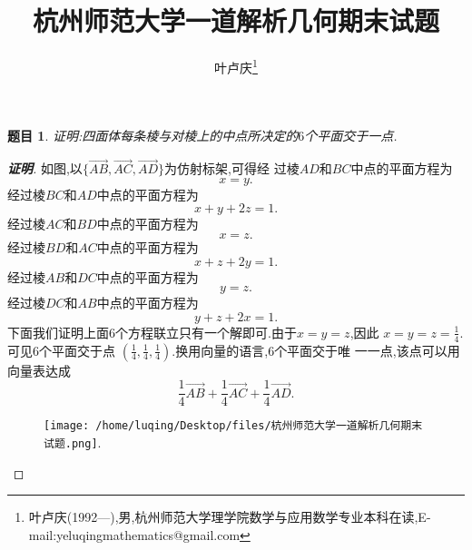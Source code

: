 \documentclass[a4paper]{article}
\newtheorem*{exe}{题目}
\newenvironment{exercise}
{\bigskip\begin{mdframed}\begin{exe}}
    {\end{exe}\end{mdframed}\bigskip}
\newcommand{\ov}{\overrightarrow}
\begin{document}
\title{\huge{\bf{杭州师范大学一道解析几何期末试题}}} \author{\small{叶卢庆\footnote{叶卢庆(1992---),男,杭州师范大学理学院数学与应用数学专业本科在读,E-mail:yeluqingmathematics@gmail.com}}}
\maketitle
\begin{exercise}
  证明:四面体每条棱与对棱上的中点所决定的$6$个平面交于一点.
\end{exercise}
\begin{proof}[\textbf{证明}]
如图,以$\{\overrightarrow{AB},\ov{AC},\ov{AD}\}$为仿射标架,可得经
过棱$AD$和$BC$中点的平面方程为
\begin{equation}
  \label{eq:1}
  x=y.
\end{equation}
经过棱$BC$和$AD$中点的平面方程为
\begin{equation}
  \label{eq:4}
  x+y+2z=1.
\end{equation}
经过棱$AC$和$BD$中点的平面方程为
\begin{equation}
  \label{eq:2}
  x=z.
\end{equation}
经过棱$BD$和$AC$中点的平面方程为
\begin{equation}
  \label{eq:5}
  x+z+2y=1.
\end{equation}
经过棱$AB$和$DC$中点的平面方程为
\begin{equation}
  \label{eq:3}
  y=z.
\end{equation}
经过棱$DC$和$AB$中点的平面方程为
\begin{equation}
  \label{eq:6}
  y+z+2x=1.
\end{equation}
下面我们证明上面$6$个方程联立只有一个解即可.由于$x=y=z$,因此
$x=y=z=\frac{1}{4}$.可见$6$个平面交于点
$(\frac{1}{4},\frac{1}{4},\frac{1}{4})$.换用向量的语言,$6$个平面交于唯
一一点,该点可以用向量表达成
$$
\frac{1}{4}\overrightarrow{AB}+\frac{1}{4}\ov{AC}+\frac{1}{4}\ov{AD}.
$$
\begin{figure}[h]\label{fig:1}
  \centering
\texttt{[image: /home/luqing/Desktop/files/杭州师范大学一道解析几何期末试题.png]}.
  \caption{}
\end{figure}
\end{proof}
\end{document}

